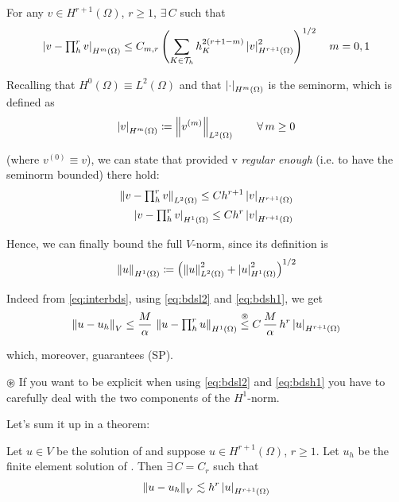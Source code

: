 \begin{theorem}
For any $v\in H^{r+1}(\Omega)$, $r\geq 1$, $\exists\,C$ such that
\begin{equation*}
\left\lvert v-\textstyle\prod_h^r v \right\rvert_{H^m(\Omega)}\leq C_{m,r} \left( \sum_{K\in\mathcal{T}_h} h_K^{2(r+1-m)}\left\lvert v \right\rvert^2_{H^{r+1}(\Omega)} \right)^{1/2}\quad m=0,1
\end{equation*}

Recalling that $H^0(\Omega)\equiv L^2(\Omega)$ and that $\left\lvert \cdot \right\rvert_{H^m(\Omega)}$ is the seminorm, which is defined as
\begin{equation*}
\left\lvert v \right\rvert_{H^m(\Omega)}\coloneq \left\lVert v^{(m)} \right\rVert_{L^2(\Omega)}\qquad \forall\, m\geq 0
\end{equation*}

(where $v^{(0)}\equiv v$), we can state that provided v \emph{regular enough} (i.e. to have the seminorm bounded) there hold:
\begin{align}
\label{eq:bdsl2}
\left\lVert v-\textstyle\prod_h^r v \right\rVert_{L^2(\Omega)}\leq C h^{r+1} \left\lvert v \right\rvert_{H^{r+1}(\Omega)}
\\
\label{eq:bdsh1}
\left\lvert v-\textstyle\prod_h^r v \right\rvert_{H^1(\Omega)}\leq C h^r \left\lvert v \right\rvert_{H^{r+1}(\Omega)}
\end{align}
\end{theorem}\vspace{-0.3cm}

Hence, we can finally bound the full $V$-norm, since its definition is
\begin{equation*}
\left\lVert u \right\rVert_{H^1(\Omega)}\coloneq \left( \left\lVert u \right\rVert_{L^2(\Omega)}^2+ \left\lvert u \right\rvert_{H^1(\Omega)}^2 \right)^{1/2}
\end{equation*}

Indeed from \eqref{eq:interbds}, using \eqref{eq:bdsl2} and \eqref{eq:bdsh1}, we get
\begin{equation*}
\left\lVert u-u_h \right\rVert_V\leq \frac{M}{\alpha} \,\left\lVert u-\textstyle\prod_h^r u \right\rVert_{H^1(\Omega)} \overset{\circledast}{\leq} C\,\frac{M}{\alpha}\,h^{r}\left\lvert u \right\rvert_{H^{r+1}(\Omega)} 
\end{equation*}

which, moreover, guarantees (SP).

\smallskip

$\circledast$ If you want to be explicit when using \eqref{eq:bdsl2} and \eqref{eq:bdsh1} you have to carefully deal with the two components of the $H^1$-norm.

\newpage

Let's sum it up in a theorem:
\begin{theorem}
Let $u\in V$ be the solution of {} and suppose $u\in H^{r+1}(\Omega)$, $r\geq 1$. Let $u_h$ be the finite element solution of {}. Then $\exists\,C=C_r$ such that
\begin{equation}
\label{eq:finalH1bds}
\left\lVert u-u_h \right\rVert_V\lesssim h^r\left\lvert u \right\rvert_{H^{r+1}(\Omega)}
\end{equation} 
\end{theorem}\vspace{-0.2cm}

